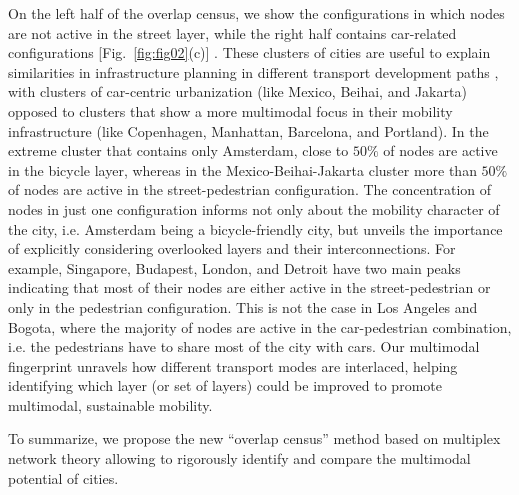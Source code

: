 On the left half of the overlap census, we show the configurations in which nodes are not active in the street layer, while the right half contains car-related configurations [Fig.~\ref{fig:fig02}(c)] . These clusters of cities are useful to explain similarities in infrastructure planning in different transport development paths \cite{Rodrigue2013Geography,Louf2014Typology}, with clusters of car-centric urbanization (like Mexico, Beihai, and Jakarta) opposed to clusters that show a more multimodal focus in their mobility infrastructure (like Copenhagen, Manhattan, Barcelona, and Portland). In the extreme cluster that contains only Amsterdam, close to $50\%$ of nodes are active in the bicycle layer, whereas in the Mexico-Beihai-Jakarta cluster more than $50\%$ of nodes are active in the street-pedestrian configuration. The concentration of nodes in just one configuration informs not only about the mobility character of the city, i.e. Amsterdam being a bicycle-friendly city, but unveils the importance of explicitly considering overlooked layers and their interconnections. For example, Singapore, Budapest, London, and Detroit have two main peaks indicating that most of their nodes are either active in the street-pedestrian or only in the pedestrian configuration. This is not the case in Los Angeles and Bogota, where the majority of nodes are active in the car-pedestrian combination, i.e. the pedestrians have to share most of the city with cars. Our multimodal fingerprint unravels how different transport modes are interlaced, helping identifying which layer (or set of layers) could be improved to promote multimodal, sustainable mobility.

To summarize, we propose the new ``overlap census'' method based on multiplex network theory allowing to rigorously identify and compare the multimodal potential of cities. 
